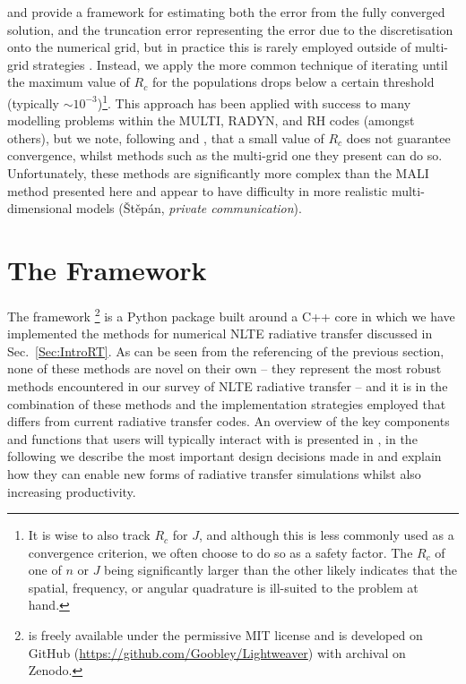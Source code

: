 \citet{Auer1994a} and \citet{FabianiBendicho1997} provide a framework for estimating both the error from the fully converged solution, and the truncation error representing the error due to the discretisation onto the numerical grid, but in practice this is rarely employed outside of multi-grid strategies \citep[e.g.][]{FabianiBendicho1997,Leger2007}.
Instead, we apply the more common technique of iterating until the maximum value of $R_c$ for the populations drops below a certain threshold (typically $\sim 10^{-3}$)\footnote{It is wise to also track $R_c$ for $J$, and although this is less commonly used as a convergence criterion, we often choose to do so as a safety factor. The $R_c$ of one of $n$ or $J$ being significantly larger than the other likely indicates that the spatial, frequency, or angular quadrature is ill-suited to the problem at hand.}.
This approach has been applied with success to many modelling problems within the MULTI, RADYN, and RH \citet{Uitenbroek2001} codes (amongst others), but we note, following \citet{Auer1994a} and \citet{FabianiBendicho1997}, that a small value of $R_c$ does not guarantee convergence, whilst methods such as the multi-grid one they present can do so.
Unfortunately, these methods are significantly more complex than the MALI method presented here and appear to have difficulty in more realistic multi-dimensional models (Štěpán, \emph{private communication}).

\section{The \Lw{} Framework}

The \Lw{} framework \citep{Osborne2021, LightweaverZenodo}\footnote{\Lw{} is freely available under the permissive MIT license and is developed on GitHub (\url{https://github.com/Goobley/Lightweaver}) with archival on Zenodo.} is a Python package built around a C++ core in which we have implemented the methods for numerical NLTE radiative transfer discussed in Sec.~\ref{Sec:IntroRT}.
As can be seen from the referencing of the previous section, none of these methods are novel on their own -- they represent the most robust methods encountered in our survey of NLTE radiative transfer -- and it is in the combination of these methods and the implementation strategies employed that \Lw{} differs from current \Sota{} radiative transfer codes.
An overview of the key components and functions that users will typically interact with is presented in \citet{Osborne2021}, in the following we describe the most important design decisions made in \Lw{} and explain how they can enable new forms of radiative transfer simulations whilst also increasing productivity.

